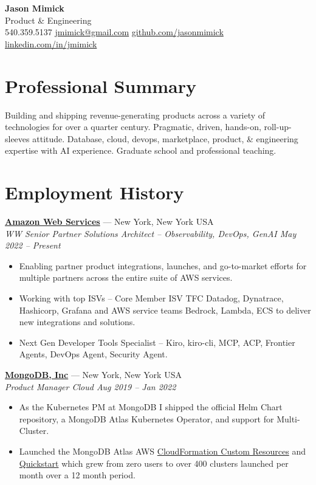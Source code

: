 \documentclass[10pt,letterpaper]{article}
\begin{document}
\begin{center}
{\LARGE\bfseries Jason Mimick}\\[4pt]
{\large Product \& Engineering}\\[6pt]
540.359.5137 \quad
\href{mailto:jmimick@gmail.com}{jmimick@gmail.com} \quad
\href{https://github.com/jasonmimick}{github.com/jasonmimick} \quad
\href{https://www.linkedin.com/in/jmimick}{linkedin.com/in/jmimick}
\end{center}

\section{Professional Summary}
Building and shipping revenue-generating products across a variety of technologies for over a quarter century.
Pragmatic, driven, hands-on, roll-up-sleeves attitude.
Database, cloud, devops, marketplace, product, \& engineering expertise with AI experience.
Graduate school and professional teaching.

\section{Employment History}

\textbf{\href{https://aws.amazon.com/}{Amazon Web Services}} --- New York, New York USA\\
\textit{WW Senior Partner Solutions Architect -- Observability, DevOps, GenAI \hfill May 2022 -- Present}
\begin{itemize}
\item Enabling partner product integrations, launches, and go-to-market efforts for multiple partners across the entire suite of AWS services.
\item Working with top ISVs -- Core Member ISV TFC Datadog, Dynatrace, Hashicorp, Grafana and AWS service teams Bedrock, Lambda, ECS to deliver new integrations and solutions.
\item Next Gen Developer Tools Specialist -- Kiro, kiro-cli, MCP, ACP, Frontier Agents, DevOps Agent, Security Agent.
\end{itemize}

\textbf{\href{https://www.mongodb.com/}{MongoDB, Inc}} --- New York, New York USA\\
\textit{Product Manager Cloud \hfill Aug 2019 -- Jan 2022}
\begin{itemize}
\item As the Kubernetes PM at MongoDB I shipped the official Helm Chart repository, a MongoDB Atlas Kubernetes Operator, and support for Multi-Cluster.
\item Launched the MongoDB Atlas AWS \href{https://github.com/mongodb/mongodbatlas-cloudformation-resources}{CloudFormation Custom Resources} and \href{https://aws.amazon.com/quickstart/architecture/mongodb-atlas/}{Quickstart} which grew from zero users to over 400 clusters launched per month over a 12 month period.
\end{itemize}
\end{document}
